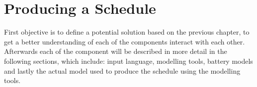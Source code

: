 \chapter{Producing a Schedule} \label{cha:produce}
First objective is to define a potential solution based on the previous chapter, to get a better understanding of each of the components interact with each other. Afterwards each of the component will be described in more detail in the following sections, which include: input language, modelling tools, battery models and lastly the actual model used to produce the schedule using the modelling tools.








%